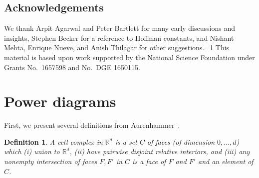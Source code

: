 \documentclass[11pt]{article}
\newcommand{\Comments}{1}
\newcommand{\mytodo}[2]{\ifnum\Comments=1%
  \todo[linecolor=#1!80!black,backgroundcolor=#1,bordercolor=#1!80!black]{#2}\fi}
\newcommand{\raft}[1]{\mytodo{green!20!white}{RF: #1}}
\newcommand{\reals}{\mathbb{R}}
\newtheorem{conjecture}{Conjecture}
\newtheorem{definition}{Definition}
\begin{document}




\subsection*{Acknowledgements}
We thank Arpit Agarwal and Peter Bartlett for many early discussions and insights,
Stephen Becker for a reference to Hoffman constants,
and Nishant Mehta, Enrique Nueve, and Anish Thilagar for other suggestions.\raft{others?}
This material is based upon work supported by the National Science Foundation under Grants No.\ 1657598 and No.\ DGE 1650115.
\newpage



\appendix

\newpage
\section{Power diagrams}\label{app:power-diagrams}
First, we present several definitions from Aurenhammer~\cite{aurenhammer1987power}.
\begin{definition}\label{def:cell-complex}
  A \emph{cell complex} in $\reals^d$ is a set $C$ of faces (of dimension $0,\ldots,d$) which (i) union to $\reals^d$, (ii) have pairwise disjoint relative interiors, and (iii) any nonempty intersection of faces $F,F'$ in $C$ is a face of $F$ and $F'$ and an element of $C$.
\end{definition}
\end{document}
